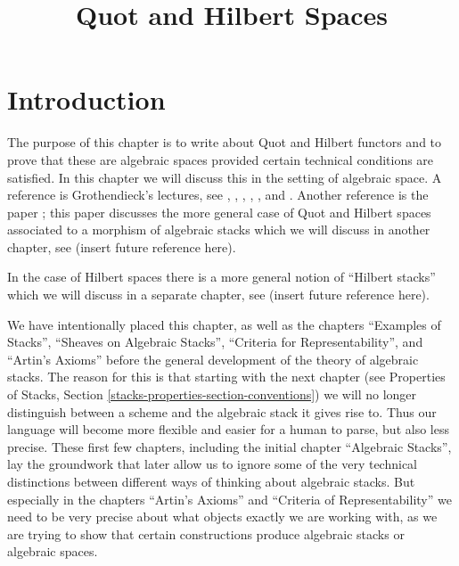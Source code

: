

%


\title{Quot and Hilbert Spaces}

\maketitle

\label{section-phantom}

\tableofcontents




\section{Introduction}
\label{section-introduction}

\noindent
The purpose of this chapter is to write about Quot and Hilbert functors
and to prove that these are algebraic spaces provided certain technical
conditions are satisfied. In this chapter we will discuss this in the
setting of algebraic space. A reference is Grothendieck's lectures, see
\cite{Gr-I},
\cite{Gr-II},
\cite{Gr-III},
\cite{Gr-IV},
\cite{Gr-V}, and
\cite{Gr-VI}.
Another reference is the paper \cite{olsson-starr}; this paper discusses
the more general case of Quot and Hilbert spaces associated to a morphism
of algebraic stacks which we will discuss in another chapter, see
(insert future reference here).

\medskip\noindent
In the case of Hilbert spaces there is a more general notion of
``Hilbert stacks'' which we will discuss in a separate chapter, see
(insert future reference here).

\medskip\noindent
We have intentionally placed this chapter, as well as the chapters
``Examples of Stacks'', ``Sheaves on Algebraic Stacks'',
``Criteria for Representability'', and ``Artin's Axioms'' before the
general development of the theory of algebraic stacks. The reason
for this is that starting with the next chapter (see
Properties of Stacks, Section \ref{stacks-properties-section-conventions})
we will no longer distinguish between a scheme and the algebraic stack
it gives rise to. Thus our language will become more flexible and
easier for a human to parse, but also less precise. These first few
chapters, including the initial chapter ``Algebraic Stacks'', lay the
groundwork that later allow us to ignore some of the very technical
distinctions between different ways of thinking about algebraic stacks.
But especially in the chapters ``Artin's Axioms'' and
``Criteria of Representability'' we need
to be very precise about what objects exactly we are working with, as
we are trying to show that certain constructions produce algebraic stacks or
algebraic spaces.

